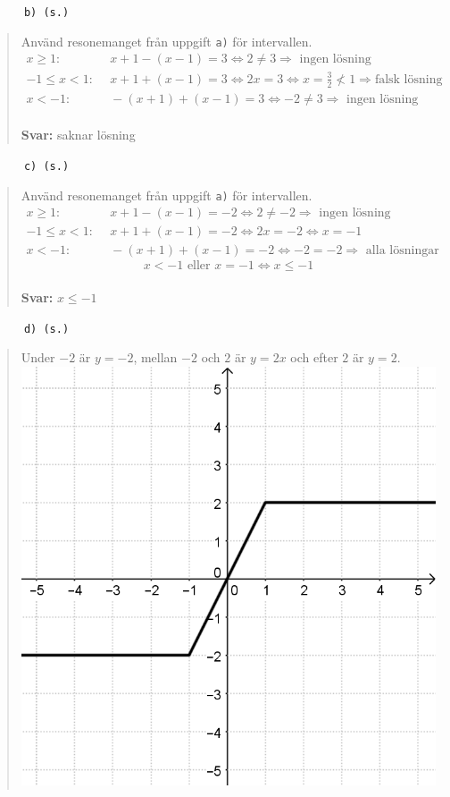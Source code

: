 \documentclass[a4paper]{article}
\newcommand{\tskcol}[1]{\textcolor{tskcol}{#1}}
\begin{document}
	\texttt{\tskcol{~~~~~~b) (s.)}}
	\begin{quotation}
		\noindent
		Använd resonemanget från uppgift \texttt{\tskcol{a)}} för intervallen.
		\begin{align*}
		     x \ge 1:&~~ x+1-(x-1) = 3 \Leftrightarrow 2 \neq 3 \Rightarrow \text{ ingen lösning}\\
		-1 \le x < 1:&~~ x+1+(x-1) = 3 \Leftrightarrow 2x = 3 \Leftrightarrow x = \frac{3}{2} \not< 1 \Rightarrow\text{falsk lösning}\\
		      x < -1:&~~ -(x+1)+(x-1) = 3 \Leftrightarrow -2 \neq 3 \Rightarrow \text{ ingen lösning}
		\end{align*}
		\\
		\textbf{Svar:} saknar lösning
	\end{quotation}
	
	\texttt{\tskcol{~~~~~~c) (s.)}}
	\begin{quotation}
		\noindent
		Använd resonemanget från uppgift \texttt{\tskcol{a)}} för intervallen.
		\begin{align*}
		x \ge 1:&~~ x+1-(x-1) = -2 \Leftrightarrow 2 \neq -2 \Rightarrow \text{ ingen lösning}\\
		-1 \le x < 1:&~~ x+1+(x-1) = -2 \Leftrightarrow 2x = -2 \Leftrightarrow x = -1\\
		x < -1:&~~ -(x+1)+(x-1) = -2 \Leftrightarrow -2 = -2 \Rightarrow \text{ alla lösningar}
		\end{align*}
		\[x < -1 \text{ eller } x=-1 \Leftrightarrow x \le -1\]
		\\
		\textbf{Svar:} $x \le -1$
	\end{quotation}
	
	\texttt{\tskcol{~~~~~~d) (s.)}}
	\begin{quotation}
		\noindent
		Under $-2$ är $y=-2$, mellan $-2$ och $2$ är $y=2x$ och efter $2$ är $y=2$. \\
		\includegraphics[scale=0.2]{images/522d.png}
	\end{quotation}
	
\end{document}
